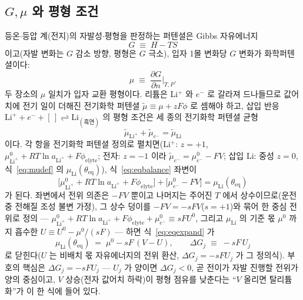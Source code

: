 \documentclass[11pt,a4paper]{article}
\newcommand{\eq}{\mathrm{eq}}
\begin{document}
\subsection{$G,\mu$ 와 평형 조건}
등온$\cdot$등압 계(전지)의 자발성$\cdot$평형을 판정하는 퍼텐셜은 Gibbs 자유에너지
\begin{equation}
G\;\equiv\;H-TS
\label{eq:gibbsdef}
\end{equation}
이고(자발 변화는 $G$ 감소 방향, 평형은 $G$ 극소), 입자 1몰 변화당 $G$ 변화가 화학퍼텐셜이다:
\begin{equation}
\mu\;\equiv\;\frac{\partial G}{\partial n}\Big|_{T,P}.
\label{eq:mudef}
\end{equation}
두 장소의 $\mu$ 일치가 입자 교환 평형이다. 리튬은 Li$^+$ 와 $e^-$ 로 갈라져 드나들므로 값어치에 전기 일이 더해진
전기화학 퍼텐셜 $\tilde\mu\equiv\mu+zF\phi$ 로 셈해야 하고, 삽입 반응
$\mathrm{Li}^++e^-+[\,]\rightleftharpoons\mathrm{Li}_{(\text{흑연})}$ 의 평형 조건은 세 종의 전기화학 퍼텐셜 균형
\begin{equation}
\tilde\mu_{\mathrm{Li}^+}+\tilde\mu_{e^-}=\tilde\mu_{\mathrm{Li}}
\label{eq:eqbalance}
\end{equation}
이다. 각 항을 전기화학 퍼텐셜 정의로 펼치면(Li$^+$: $z=+1$, $\mu^0_{\mathrm{Li}^+}+RT\ln a_{\mathrm{Li}^+}+F\phi_\mathrm{elyte}$;
전자: $z=-1$ 이라 $\tilde\mu_{e^-}=\mu^0_{e^-}-FV$; 삽입 Li: 중성 $z=0$, 식~\eqref{eq:mudef} 의 $\mu_\mathrm{Li}(\theta_\eq)$),
식~\eqref{eq:eqbalance} 좌변이
\begin{equation}
\big[\mu^0_{\mathrm{Li}^+}+RT\ln a_{\mathrm{Li}^+}+F\phi_\mathrm{elyte}\big]+\big[\mu^0_{e^-}-FV\big]
=\mu_\mathrm{Li}(\theta_\eq)
\label{eq:eqexpand}
\end{equation}
가 된다. 좌변에서 전위 의존은 $-FV$ 뿐이고 나머지는 주어진 $T$ 에서 상수이므로(운전 중 전해질 조성 불변 가정), 그
상수 덩이를 $-FV=-sFV$($s=+1$)와 묶어 한 중심 전위로 정의 --- $\mu^0_{\mathrm{Li}^+}+RT\ln a_{\mathrm{Li}^+}
+F\phi_\mathrm{elyte}+\mu^0_{e^-}\equiv sFU^0$, 그리고 $\mu_\mathrm{Li}$ 의 기준 몫 $\mu^0$ 까지 흡수한
$U\equiv U^0-\mu^0/(sF)$ --- 하면 식~\eqref{eq:eqexpand} 가
\begin{equation}
\mu_\mathrm{Li}(\theta_\eq)\;=\;\mu^0-sF\,(V-U),
\qquad \Delta G_j\;\equiv\;-sF\,U_j
\label{eq:eqcond}
\end{equation}
로 닫힌다($U$ 는 비배치 몫 자유에너지의 전위 환산, $\Delta G_j=-sFU_j$ 가 그 정의식). 부호의 핵심은
$\Delta G_j=-sFU_j$ --- $U_j$ 가 양이면 $\Delta G_j<0$, 곧 전이가 자발 진행할 전위가 양의 중심이고, $V$ 상승(전자
값어치 하락)이 평형 점유를 낮춘다는 ``$V$ 올리면 탈리튬화''가 이 한 식에 들어 있다.
\end{document}
